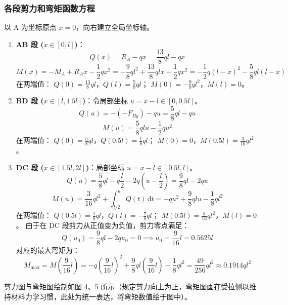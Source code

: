 \documentclass[11pt,a4paper]{ctexrep}
\newcommand{\diff}{\,\mathrm{d}}
\begin{document}
{\subsubsection*{各段剪力和弯矩函数方程}
以 A 为坐标原点 $x=0$，向右建立全局坐标轴。
\begin{enumerate}
    \item \textbf{AB 段 ($x \in [0, l]$)}：
          \[
              Q(x) = R_A - qx = \frac{13}{8} ql - qx
          \]
          \[
              M(x) = -M_A + R_A x - \frac{1}{2} qx^2 = -\frac{9}{8} ql^2 + \frac{13}{8} qlx - \frac{1}{2} qx^2 = -\frac{1}{2}q(l-x)^2 - \frac{5}{8}ql(l-x)
          \]
          在两端值：
          $Q(0) = \frac{13}{8} ql$，$Q(l) = \frac{5}{8} ql$；
          $M(0) = -\frac{9}{8} ql^2$，$M(l) = 0$。
    \item \textbf{BD 段 ($x \in [l, 1.5l]$)}：令局部坐标 $u = x-l \in [0, 0.5l]$。
          \[
              Q(u) = -(-F_{By}) - qu = \frac{5}{8} ql - qu
          \]
          \[
              M(u) = \frac{5}{8} ql u - \frac{1}{2} qu^2
          \]
          在两端值：
          $Q(0) = \frac{5}{8} ql$，$Q(0.5l) = \frac{1}{8} ql$；
          $M(0) = 0$，$M(0.5l) = \frac{3}{16} ql^2$。
    \item \textbf{DC 段 ($x \in [1.5l, 2l]$)}：局部坐标 $u = x-l \in [0.5l, l]$。
          \[
              Q(u) = \frac{5}{8} ql - q \frac{l}{2} - 2q \left( u - \frac{l}{2} \right) = \frac{9}{8} ql - 2qu
          \]
          \[
              M(u) = \frac{3}{16} ql^2 + \int_{l/2}^{u} Q(t) \diff t = -qu^2 + \frac{9}{8} qlu - \frac{1}{8} ql^2
          \]
          在两端值：
          $Q(0.5l) = \frac{1}{8} ql$，$Q(l) = -\frac{7}{8} ql$；
          $M(0.5l) = \frac{3}{16} ql^2$，$M(l) = 0$。
          由于在 DC 段剪力从正值变为负值，剪力零点满足：
          \[
              Q(u_0) = \frac{9}{8} ql - 2q u_0 = 0 \implies u_0 = \frac{9}{16} l = 0.5625 l
          \]
          对应的最大弯矩为：
          \[
              M_{\text{max}} = M\left(\frac{9}{16}l\right) = -q \left(\frac{9}{16}l\right)^2 + \frac{9}{8} ql \left(\frac{9}{16}l\right) - \frac{1}{8} ql^2 = \frac{49}{256} ql^2 \approx 0.1914 ql^2
          \]
\end{enumerate}

剪力图与弯矩图绘制如图 4、5 所示（规定剪力向上为正，弯矩图画在受拉侧以维持材料力学习惯，此处为统一表达，将弯矩数值绘于图中）。

\begin{figure}[H]
\centering
\begin{minipage}{0.48\textwidth}
\centering
{}
\end{minipage}
\end{figure}}
\end{document}

